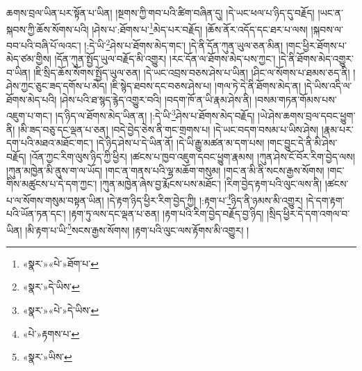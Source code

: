 ཆགས་བྲལ་ཡིན་པར་སྟོན་པ་ཡིན། །སྔགས་ཀྱི་གབ་པའི་ཚིག་བཞིན་དུ། །དེ་ཡང་ཕལ་པ་ཉིད་དུ་བརྗོད། །ཡང་ན་སྐབས་ཀྱི་ཆོས་སོགས་པའི། །ཤེས་པ་:ཐོགས་པ་\footnote{«སྣར་»«པེ་»ཐོག་པ་}མེད་པར་བརྗོད། །ཆོས་ནོར་འདོད་དང་ཐར་པ་ལས། །སྐབས་ལ་བབ་པའི་བཞི་པོ་ལའང་། །:དེ་ཡི་\footnote{«སྣར་»དེ་ཡིས་}ཤེས་པ་ཐོགས་མེད་གང་། །དེ་ནི་དོན་ཀུན་ཡུལ་ཅན་མིན། །གང་ཕྱིར་ཐོགས་པ་མེད་ཙམ་གྱིས། །དོན་ཀུན་སྤྱོད་ཡུལ་བརྗོད་མི་འགྱུར། །རང་དོན་ལ་ཐོགས་མེད་པས་ཀྱང་། །དེ་ནི་ཐོགས་མེད་འགྱུར་བ་ཡིན། །ཇི་སྲིད་ཆོས་སོགས་སྤྱོད་ཡུལ་ཅན། །དེ་ཡང་འབྲས་བཅས་ཤེས་པ་ཡིན། །ཤིང་ལ་སོགས་པ་ཐམས་ཅད་ནི། །ཤེས་ཀྱང་ཅུང་ཟད་དགོས་པ་མེད། །ཇི་སྙེད་ཐབས་དང་བཅས་ཤེས་པ། །གལ་ཏེ་དེ་ནི་ཐོགས་མེད་ན། །དེ་ཡིས་འདི་ལ་ཐོགས་མེད་པའི། །ཤེས་པའི་ཐ་སྙད་རྙེད་འགྱུར་བའི། །བདག་ཁོ་ན་ཡི་རྣམ་ཤེས་ནི། །བསམ་གཏན་གོམས་པས་འཇུག་པ་གང་། །ད་ཉིད་ལ་ཐོགས་མེད་ཡིན་ན། །:དེ་ཡི་\footnote{«སྣར་»«པེ་»དེ་ཡིས་}ཤེས་པ་ཐོགས་མེད་བརྗོད། །ཡེ་ཤེས་ཆགས་བྲལ་དབང་ཕྱུག་ནི། །མི་ཟད་བཅུ་དང་ལྡན་པ་ཅན། །བདེ་བྱེད་ཅེས་ནི་གང་གྲགས་པ། །དེ་ཡང་བདག་བསམ་པ་ཡིས་ཤེས། །རྣམ་པར་དག་པའི་མཐའ་མཐོང་གང་། །དེ་ཉིད་ཤེས་པ་དེ་ཡིན་ནོ། །དེ་ཡི་རྒྱུ་མཚན་མ་དག་པས། །གང་བྱུང་དེ་ནི་མི་ཤེས་བརྗོད། །འོན་ཀྱང་རིག་ལུས་ཉིད་ཀྱི་ཕྱིར། །ཚངས་པ་ཁྱབ་འཇུག་དབང་ཕྱུག་རྣམས། །ཀུན་ཤེས་ངོ་བོར་རིག་བྱེད་ལས། །ཀུན་མཁྱེན་མི་ནུས་ག་ལ་ཡོད། །གང་ན་གནས་པའི་ལྷ་མཆོག་གསུམ། །གང་ན་མི་ནི་སངས་རྒྱས་སོགས། །གང་གིས་མཚུངས་པ་དེ་དག་ཀྱང་། །ཀུན་མཁྱེན་ཞེས་བྱ་རྨོངས་པས་མཐོང་། །རིག་བྱེད་རྟག་པའི་ལུང་ལས་ནི། །ཚངས་པ་ལ་སོགས་གསུམ་བསྟན་ཡིན། །དེ་རྟག་ཉིད་ཕྱིར་རིག་བྱེད་ཀྱི། །:རྟག་པ་\footnote{«པེ་»རྟགས་པ་}ཉིད་ནི་ཉམས་མི་འགྱུར། །དེ་དག་རྟག་པའི་ཡོན་ཏན་དང་། །རྟག་ཏུ་ལས་དང་ལྡན་པ་ཅན། །རྟག་པའི་རིག་བྱེད་བརྗོད་བྱ་ཉིད། །སྲིད་ཕྱིར་དེ་དག་འགལ་བ་ཡིན། །མི་རྟག་པ་ཡི་\footnote{«སྣར་»ཡིས་}སངས་རྒྱས་སོགས། །རྟག་པའི་ལུང་ལས་རྟོགས་མི་འགྱུར། །
